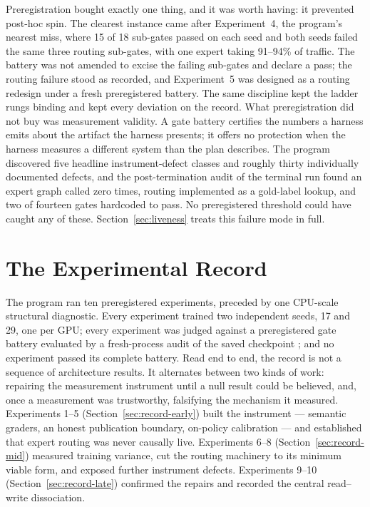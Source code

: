 \documentclass[10pt,a4paper]{article}
\begin{document}
Preregistration bought exactly one thing, and it was worth having: it
prevented post-hoc spin. The clearest instance came after Experiment~4, the
program's nearest miss, where 15 of 18 sub-gates passed on each seed and both
seeds failed the same three routing sub-gates, with one expert taking
91--94\% of traffic. The battery was not amended to excise the failing
sub-gates and declare a pass; the routing failure stood as recorded, and
Experiment~5 was designed as a routing redesign under a fresh preregistered
battery. The same discipline kept the ladder rungs binding and kept every
deviation on the record. What preregistration did not buy was measurement
validity. A gate battery certifies the numbers a harness emits about the
artifact the harness presents; it offers no protection when the harness
measures a different system than the plan describes. The program discovered
five headline instrument-defect classes and roughly thirty individually
documented defects, and the post-termination audit of the terminal run found
an expert graph called zero times, routing implemented as a gold-label
lookup, and two of fourteen gates hardcoded to pass. No preregistered
threshold could have caught any of these. Section~\ref{sec:liveness} treats
this failure mode in full.

\section{The Experimental Record}\label{sec:record}

The program ran ten preregistered experiments, preceded by one CPU-scale structural diagnostic. Every experiment trained two independent seeds, 17 and 29, one per GPU; every experiment was judged against a preregistered gate battery evaluated by a fresh-process audit of the saved checkpoint \cite{vanmiltenburg2021}; and no experiment passed its complete battery. Read end to end, the record is not a sequence of architecture results. It alternates between two kinds of work: repairing the measurement instrument until a null result could be believed, and, once a measurement was trustworthy, falsifying the mechanism it measured. Experiments 1--5 (Section~\ref{sec:record-early}) built the instrument --- semantic graders, an honest publication boundary, on-policy calibration --- and established that expert routing was never causally live. Experiments 6--8 (Section~\ref{sec:record-mid}) measured training variance, cut the routing machinery to its minimum viable form, and exposed further instrument defects. Experiments 9--10 (Section~\ref{sec:record-late}) confirmed the repairs and recorded the central read--write dissociation.
\end{document}
